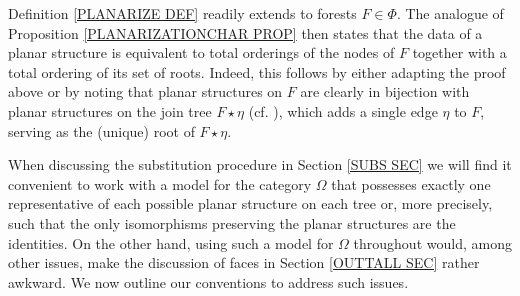 \documentclass[a4paper,10pt]{article}%
\begin{document}
\begin{remark}\label{FORESTPLAN REM}
  Definition \ref{PLANARIZE DEF} readily extends to forests $F \in \Phi$. The analogue of Proposition \ref{PLANARIZATIONCHAR PROP} then states that the data of a planar structure is 
  equivalent to total orderings of the nodes of $F$ together with a total ordering of its set of roots.
  Indeed, this follows by either adapting the proof above or by noting that planar structures on $F$ are clearly in bijection with planar structures on the join tree $F \star \eta$ 
  (cf. \cite[Def. 7.44]{Pe17}), which adds a single edge $\eta$ to $F$, serving as the (unique) root of $F \star \eta$.
\end{remark}


When discussing the substitution procedure in Section \ref{SUBS SEC} we will find it convenient to work with a model for the category $\Omega$ that possesses exactly one representative of each possible planar structure on each tree or, more precisely, such that the only isomorphisms preserving the planar structures are the identities. On the other hand, using such a model for $\Omega$ throughout would, among other issues, make the discussion of faces in Section \ref{OUTTALL SEC} rather awkward.
We now outline our conventions to address such issues.
\end{document}
